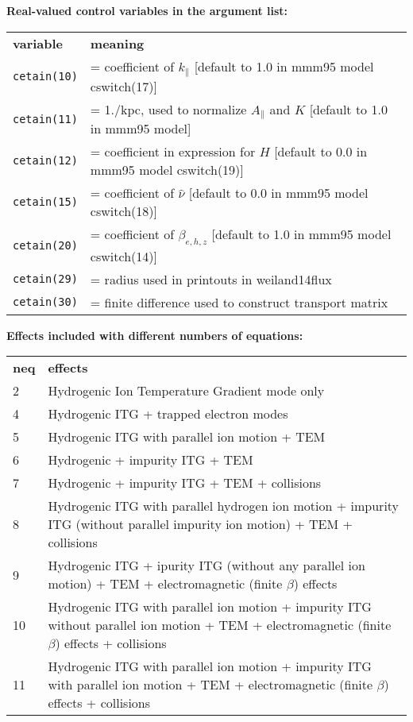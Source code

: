\renewcommand{\arraystretch}{1.0}
\begin{center}
{\bf Real-valued control variables in the argument list:}
\begin{tabular}{lp{6.0in}}
{\bf variable} & {\bf meaning} \\
{\tt cetain(10)} & = coefficient of $ k_\parallel $ [default to 1.0 in mmm95 model cswitch(17)] \\
{\tt cetain(11)}  & = 1./kpc, used to normalize $A_\parallel$ and $K$ [default to 1.0 in mmm95 model] \\
{\tt cetain(12)} & = coefficient in expression for $H$ [default to 0.0 in mmm95 model cswitch(19)] \\
{\tt cetain(15)} & = coefficient of $ \hat{\nu} $ [default to 0.0 in mmm95 model cswitch(18)] \\
{\tt cetain(20)} & = coefficient of $ \beta_{e,h,z} $ [default to 1.0 in mmm95 model cswitch(14)] \\
{\tt cetain(29)} & = radius used in printouts in weiland14flux\\
{\tt cetain(30)} & = finite difference used to construct
                   transport matrix \\
\end{tabular}
\end{center}

\renewcommand{\arraystretch}{1.0}
\begin{center}
{\bf Effects included with different numbers of equations:}
\begin{tabular}{lp{5.0in}}
{\bf neq} & {\bf effects} \\
2 & Hydrogenic Ion Temperature Gradient mode only \\
4 & Hydrogenic ITG + trapped electron modes \\
5 & Hydrogenic ITG with parallel ion motion + TEM \\
6 & Hydrogenic + impurity ITG + TEM \\
7 & Hydrogenic + impurity ITG + TEM + collisions \\
8 & Hydrogenic ITG with parallel hydrogen ion motion  
  + impurity ITG (without parallel impurity ion motion)
  + TEM + collisions\\
9 & Hydrogenic ITG + ipurity ITG (without any parallel ion motion)
  + TEM + electromagnetic (finite $\beta$) effects \\
10 & Hydrogenic ITG with parallel ion motion
  + impurity ITG without parallel ion motion
  + TEM + electromagnetic (finite $\beta$) effects + collisions \\
11 & Hydrogenic ITG with parallel ion motion
  + impurity ITG with parallel ion motion
  + TEM + electromagnetic (finite $\beta$) effects + collisions \\

\end{tabular}
\end{center}

